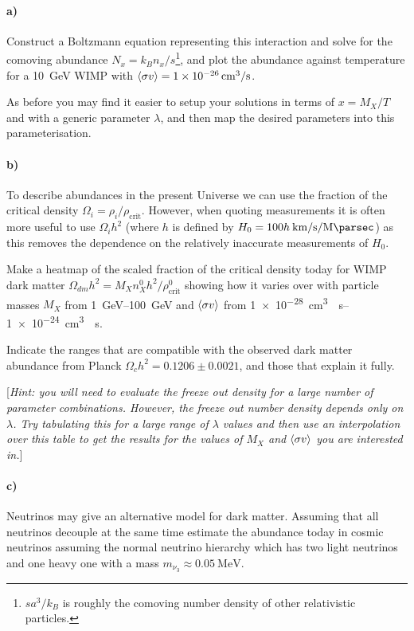 \documentclass[12pt]{article}
\begin{document}
\paragraph{a)} Construct a Boltzmann equation representing this interaction and solve for the comoving abundance $N_x = k_B n_x / s$\footnote{$s a^3 / k_B$ is roughly the comoving number density of other relativistic particles.}, and plot the abundance against temperature for a \SI{10}{\GeV} WIMP with $\langle \sigma v \rangle = \SI{1e-26}{\centi\metre^3\per\second}$.

As before you may find it easier to setup your solutions in terms of $x = M_X / T$ and with a generic parameter $\lambda$, and then map the desired parameters into this parameterisation.

\paragraph{b)} To describe abundances in the present Universe we can use the fraction of the critical density $\Omega_i = \rho_i / \rho_\text{crit}$. However, when quoting measurements it is often more useful to use $\Omega_i h^2$ (where $h$ is defined by $H_0 = 100 h\: \si{\kilo\metre\per\second\per\mega\parsec}$) as this removes the dependence on the relatively inaccurate measurements of $H_0$.

Make a heatmap of the scaled fraction of the critical density today for WIMP dark matter $\Omega_{dm} h^2 = M_X n_X^0 h^2 / \rho_\text{crit}^0$ showing how it varies over with particle masses $M_X$ from \SIrange{1}{100}{\GeV} and $\langle \sigma v \rangle$ from \SIrange{1e-28}{1e-24}{\centi\metre^3 \per\second}.

Indicate the ranges that are compatible with the observed dark matter abundance from Planck $\Omega_c h^2 = 0.1206 \pm 0.0021$, and those that explain it fully.

[\emph{Hint: you will need to evaluate the freeze out density for a large number of parameter combinations. However, the freeze out number density depends only on $\lambda$. Try tabulating this for a large range of $\lambda$ values and then use an interpolation over this table to get the results for the values of $M_X$ and $\langle \sigma v \rangle$ you are interested in.}]

\paragraph{c)} Neutrinos may give an alternative model for dark matter. Assuming that all neutrinos decouple at the same time estimate the abundance today in cosmic neutrinos assuming the normal neutrino hierarchy which has two light neutrinos and one heavy one with a mass $m_{\nu_3} \approx \SI{0.05}{\mega\electronvolt}$.
\end{document}
